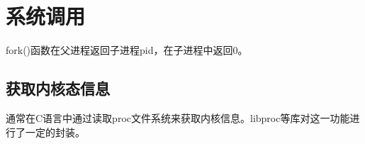 \section{系统调用}
fork()函数在父进程返回子进程pid，在子进程中返回0。

\subsection{获取内核态信息}
通常在C语言中通过读取proc文件系统来获取内核信息。libproc等库对这一功能进行了一定的封装。


